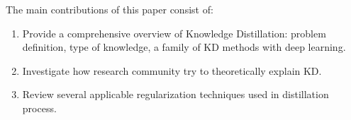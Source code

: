 The main contributions of this paper consist of:
\begin{enumerate}
   \item Provide a comprehensive overview of Knowledge Distillation: problem definition, type of knowledge, a family of KD methods with deep learning.
   \item Investigate how research community try to theoretically explain KD.
   \item Review several applicable regularization techniques used in distillation process.
\end{enumerate}
